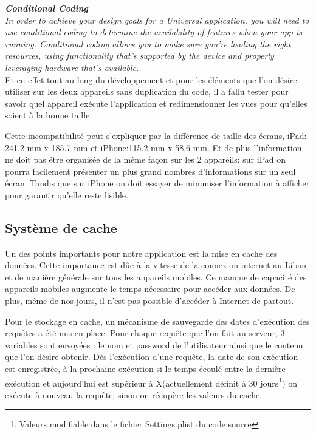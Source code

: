 	 \textit{\textbf{Conditional Coding}\\
	In order to achieve your design goals for a Universal application, you will need to use conditional coding to determine the availability of features when your app is running. Conditional coding allows you to make sure you're loading the right resources, using functionality that's supported by the device and properly leveraging hardware that's available.}\\
	
	Et en effet tout au long du développement et pour les éléments que l'on désire utiliser sur les deux appareils sans duplication du code, il a fallu tester pour savoir quel appareil exécute l'application et redimensionner les vues pour qu'elles soient à la bonne taille. 
	
	 Cette incompatibilité peut s'expliquer par la différence de taille des écrans, iPad: 241.2 mm x 185.7 mm et iPhone:115.2 mm x 58.6 mm. Et de plus l'information ne doit pas être organisée de la même façon sur les 2 appareils; sur iPad on pourra facilement présenter un plus grand nombres d'informations	 sur un seul écran. Tandis que sur iPhone on doit essayer de minimiser l'information à afficher pour garantir qu'elle reste lisible.
	 
	\subsection{Système de cache \label{sCache} }
		Un des points importants pour notre application est la mise en cache des données. Cette importance est dûe à la vitesse de la connexion internet au Liban et de manière générale sur tous les appareils mobiles. Ce manque de capacité des appareils mobiles augmente le temps nécessaire pour accéder aux données. De plus, même de nos jours, il n'est pas possible d'accéder à Internet de partout. 
		
		Pour le stockage en cache, un mécanisme de sauvegarde des dates d'exécution des requêtes a été mis en place. Pour chaque requête que l'on fait au serveur, 3 variables sont envoyées : le nom et password de l'utilisateur ainsi que le contenu que l'on désire obtenir. Dès l'exécution d'une requête, la date de son exécution est enregistrée, à la prochaine exécution si le temps écoulé entre la dernière exécution et aujourd'hui est supérieur à X(actuellement définit à 30 jours\footnote{Valeurs modifiable dans le fichier Settings.plist du code source}) on exécute à nouveau la requête, sinon on récupère les valeurs du cache.

